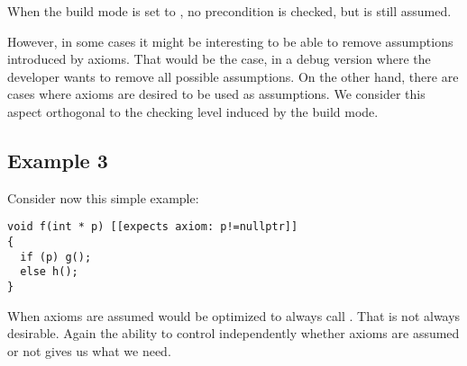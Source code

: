 When the build mode is set to , no precondition is checked, but
 is still assumed. 

However, in some cases it might be interesting to be able to remove assumptions
introduced by axioms. That would be the case, in a debug version where the 
developer wants to remove all possible assumptions. On the other hand,
there are cases where axioms are desired to be used as assumptions.
We consider this aspect orthogonal to the checking level induced by the
build mode.

\subsection{Example 3}

Consider now this simple example:

\begin{lstlisting}
void f(int * p) [[expects axiom: p!=nullptr]]
{
  if (p) g();
  else h();
}
\end{lstlisting}

When axioms are assumed  would be optimized to always call 
. 
That is not always desirable.
Again the ability to control independently  whether axioms are assumed or not
gives us what we need.

